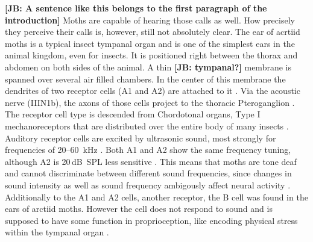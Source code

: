 \documentclass[12pt,a4paper]{article}
\newcommand{\note}[2][]{\textbf{[#1: #2]}}
\newcommand{\notejb}[1]{\note[JB]{#1}}
\begin{document}
\notejb{A sentence like this belongs to the first paragraph of the introduction}
Moths are capable of hearing those calls as well. How precisely they perceive their calls is, however, still not absolutely clear.
The ear of acrtiid moths is a typical insect tympanal organ and is one of the simplest ears in the animal kingdom, even for insects. It is positioned right between the thorax and abdomen on both sides of the animal. A thin \notejb{tympanal?} membrane is spanned over several air filled chambers. In the center of this membrane the dendrites of two receptor cells (A1 and A2) are attached to it \cite{yager1999}. Via the acoustic nerve (IIIN1b), the axons of those cells project to the thoracic Pteroganglion \cite{paul1973}. The receptor cell type is descended from Chordotonal organs, Type I mechanoreceptors that are distributed over the entire body of many insects \cite{miller2001, yack2004}. Auditory receptor cells are excited by ultrasonic sound, most strongly for frequencies of 20--60~kHz \cite{fullard1988, yager1999, terhofstede2013, nakano2014}. Both A1 and A2 show the same frequency tuning, although A2 is 20\,dB~SPL less sensitive \cite{miller2001}. This means that moths are tone deaf and cannot discriminate between different sound frequencies, since changes in sound intensity as well as sound frequency ambigously affect neural activity \cite{roeder1966, terhofstede2013}. Additionally to the A1 and A2 cells, another receptor, the B cell was found in the ears of arctiid moths. However the cell does not respond to sound \cite{fullard2003} and is supposed to have some function in proprioception, like encoding physical stress within the tympanal organ \cite{waters2003}.
\end{document}
